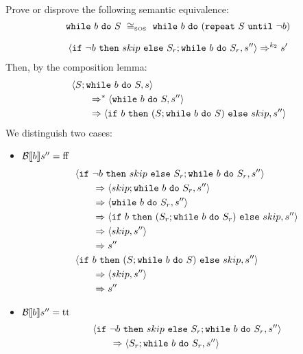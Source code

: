 \begin{exercise}{
    Prove or disprove the following semantic equivalence:
    \[ \wwhile{b}{S}\ \SOScong\ \wwhile{b}{(\wrepeat{S}{\neg b})}  \]
}
\begin{itemize}
\begin{itemize}
\begin{itemize}
\begin{gather*}
                            \left<\texttt{if}\ \neg b\ \texttt{then}\ skip\ \texttt{else}\ S_r; \texttt{while}\ b\ \texttt{do}\ S_r, s''\right> \Rightarrow^{k_2} s'
                        \end{gather*}
                        Then, by the composition lemma:
                        \begin{align*}
                            &\left<S; \texttt{while}\ b\ \texttt{do}\ S, s\right>
                            \\&\qquad\Rightarrow^* \left<\texttt{while}\ b\ \texttt{do}\ S, s''\right>
                            \\&\qquad\Rightarrow \left<\texttt{if}\ b\ \texttt{then}\ (S; \texttt{while}\ b\ \texttt{do}\ S)\ \texttt{else}\ skip, s''\right>
                        \end{align*}
                        We distinguish two cases:
                        \begin{itemize}
                            \item $\mathcal{B} \llbracket b \rrbracket s'' = \text{ff}$
                                \begin{align*}
                                    &\left<\texttt{if}\ \neg b\ \texttt{then}\ skip\ \texttt{else}\ S_r; \texttt{while}\ b\ \texttt{do}\ S_r, s''\right>
                                    \\&\qquad\Rightarrow \left<skip; \texttt{while}\ b\ \texttt{do}\ S_r, s''\right>
                                    \\&\qquad\Rightarrow \left<\texttt{while}\ b\ \texttt{do}\ S_r, s''\right>
                                    \\&\qquad\Rightarrow \left<\texttt{if}\ b\ \texttt{then}\ (S_r; \texttt{while}\ b\ \texttt{do}\ S_r)\ \texttt{else}\ skip, s''\right>
                                    \\&\qquad\Rightarrow \left<skip, s''\right>
                                    \\&\qquad\Rightarrow s''
                                    \\
                                    &\left<\texttt{if}\ b\ \texttt{then}\ (S; \texttt{while}\ b\ \texttt{do}\ S)\ \texttt{else}\ skip, s''\right>
                                    \\&\qquad\Rightarrow \left<skip, s''\right>
                                    \\&\qquad\Rightarrow s''
                                \end{align*}
                            \item $\mathcal{B} \llbracket b \rrbracket s'' = \text{tt}$
                                \begin{align*}
                                    &\instr{\wif{\neg b}{skip}{S_r}; \wwhile{b}{S_r}}{s''}
                                    \\&\qquad\Rightarrow \instr{S_r; \wwhile{b}{S_r}}{s''}

\end{align*}
\end{itemize}
\end{itemize}
\end{itemize}
\end{itemize}
\end{exercise}
